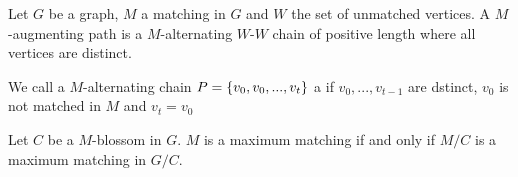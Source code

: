 \begin{lec}[2011-11-21]\end{lec}

Let $G$ be a graph, $M$ a matching in $G$ and $W$ the set of unmatched vertices.
A $M$-augmenting path is a $M$-alternating $W$-$W$ chain of positive length 
where all vertices are distinct.

We call a $M$-alternating chain $P=\left\{v_0, v_0, ..., v_t\right\}$ a 
if $v_0, ..., v_{t-1}$ are dstinct, $v_0$ is not matched in $M$ and $v_t = v_0$



\begin{thm}
	Let $C$  be a $M$-blossom in $G$. $M$ is a maximum matching if and only if 
	$M / C$ is a maximum matching in $G / C$.
\end{thm}

